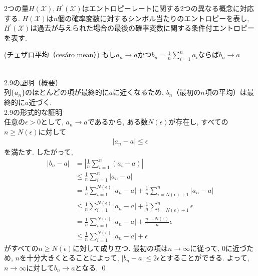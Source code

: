 \documentclass[a4j]{jsarticle}
\begin{document}
 2つの量$H(\mathcal{X}), H^\prime(\mathcal{X})$はエントロピーレートに関する2つの異なる概念に対応する. $H(\mathcal{X})$は$n$個の確率変数に対するシンボル当たりのエントロピーを表し, $H^\prime(\mathcal{X})$は過去が与えられた場合の最後の確率変数に関する条件付エントロピーを表す.\\

\begin{itembox}[l]{ (チェザロ平均（cesáro mean）)}
	もし$a_n \rightarrow a$かつ$b_n = \frac{1}{n} \sum_{i=1}^{n} a_i$ならば$b_n \rightarrow a$
\end{itembox}\\

 2.9の証明（概要）\\

列$\{a_n\}$のほとんどの項が最終的に$a$に近くなるため, $b_n$（最初の$n$項の平均）は最終的に$a$近づく.\\

 2.9の形式的な証明\\

任意の$\epsilon > 0$として, $a_n \rightarrow a$であるから, ある数$N(\epsilon)$が存在し, すべての$n \geq  N(\epsilon)$に対して\begin{align}
	|a_n - a| \leq \epsilon
\end{align}
を満たす.
したがって,
\begin{align}
	|b_n - a| & = |\frac{1}{n} \sum_{i=1}^{n} (a_i -a)|                                                             \\
	          & \leq \frac{1}{n} \sum_{i=1}^{n} |a_n -a|                                                            \\
	          & = \frac{1}{n} \sum_{i=1}^{N(\epsilon)} |a_n -a| + \frac{1}{n} \sum_{i=N(\epsilon)+1}^{n} |a_n -a|   \\
	          & \leq\frac{1}{n} \sum_{i=1}^{N(\epsilon)} |a_n -a| + \frac{1}{n} \sum_{i=N(\epsilon)+1}^{n} \epsilon \\
	          & = \frac{1}{n} \sum_{i=1}^{N(\epsilon)} |a_n -a| + \frac{n - N(\epsilon)}{n} \epsilon                \\
	          & \leq \frac{1}{n} \sum_{i=1}^{N(\epsilon)} |a_n -a| + \epsilon
\end{align}
がすべての$n \geq  N(\epsilon)$に対して成り立つ. 最初の項は$n \rightarrow \infty$に従って, 0に近づため, $n$を十分大きくとることによって, $|b_n - a| \leq 2\epsilon$とすることができる. よって, $n \rightarrow \infty$に対して$b_n \rightarrow a$となる. \qed\\
\end{document}
